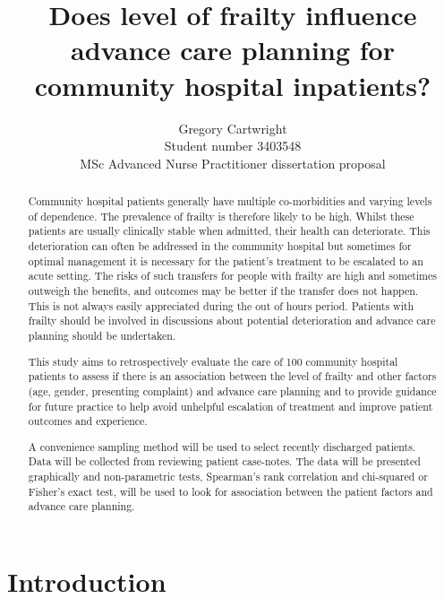 \documentclass
[
	12pt,
	a4paper,
	oneside,
]{article}
\begin{document}
\author{Gregory Cartwright\\
	Student number 3403548\\
	MSc Advanced Nurse Practitioner dissertation proposal
}
\title{Does level of frailty influence advance care planning 
	for community hospital inpatients?
}
\maketitle
\begin{abstract}
Community hospital patients generally have multiple co-morbidities and varying
levels of dependence. The prevalence of frailty is therefore likely to be high.
Whilst these patients are usually clinically stable when admitted, their health
can deteriorate. This deterioration can often be addressed in the community hospital
but sometimes for optimal management it is necessary for the patient's treatment to be
escalated to an acute setting. The risks of such transfers for people with frailty are high
and sometimes outweigh the benefits, and outcomes may be better if the transfer
does not happen. This is not always easily appreciated during the out of hours period.
Patients with frailty should be involved in discussions about
potential deterioration and advance care planning should be undertaken.

This study aims to retrospectively evaluate the care of 100 community hospital
patients to assess if there is an association between the level of frailty and other
factors (age, gender, presenting complaint) and advance
care planning and to provide guidance for future practice to 
help avoid unhelpful escalation of treatment and improve patient outcomes and 
experience.

A convenience sampling method will be used to select recently discharged patients.
Data will be collected from reviewing patient
case-notes. The data will be presented graphically and non-parametric tests, 
Spearman's rank correlation and chi-squared or Fisher's exact test, will 
be used to look for association between the patient factors and advance care planning.
\end{abstract}
\section{Introduction}
\end{document}
